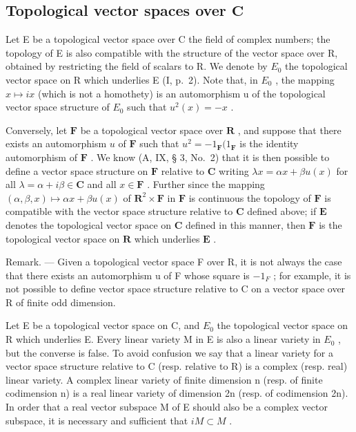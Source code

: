 \subsection{\texorpdfstring{Topological vector spaces over \(\mathbf{C}\)}{Topological vector spaces over the complex field}}

Let E be a topological vector space over C the field of complex numbers; the topology of E is also compatible with the structure of the vector space over R, obtained by restricting the field of scalars to R. We denote by \(E_{0}\) the topological vector space on R which underlies E (I, p.~2). Note that, in \(E_{0}\) , the mapping \(x \mapsto ix\) (which is not a homothety) is an automorphism u of the topological vector space structure of \(E_{0}\) such that \(u^{2}(x) = -x\) .

Conversely, let \(\mathbf{F}\) be a topological vector space over \(\mathbf{R}\) , and suppose that there exists an automorphism \(u\) of \(\mathbf{F}\) such that \(u^2 = -1_{\mathbf{F}}(1_{\mathbf{F}}\) is the identity automorphism of \(\mathbf{F}\) . We know (A, IX, § 3, No.~2) that it is then possible to define a vector space structure on \(\mathbf{F}\) relative to \(\mathbf{C}\) writing \(\lambda x = \alpha x + \beta u(x)\) for all \(\lambda = \alpha + i\beta \in \mathbf{C}\) and all \(x \in \mathbf{F}\) . Further since the mapping \((\alpha, \beta, x) \mapsto \alpha x + \beta u(x)\) of \(\mathbf{R}^2 \times \mathbf{F}\) in \(\mathbf{F}\) is continuous the topology of \(\mathbf{F}\) is compatible with the vector space structure relative to \(\mathbf{C}\) defined above; if \(\mathbf{E}\) denotes the topological vector space on \(\mathbf{C}\) defined in this manner, then \(\mathbf{F}\) is the topological vector space on \(\mathbf{R}\) which underlies \(\mathbf{E}\) .

Remark. --- Given a topological vector space F over R, it is not always the case that there exists an automorphism u of F whose square is \(-1_{F}\) ; for example, it is not possible to define vector space structure relative to C on a vector space over R of finite odd dimension.

Let E be a topological vector space on C, and \(E_{0}\) the topological vector space on R which underlies E. Every linear variety M in E is also a linear variety in \(E_{0}\) , but the converse is false. To avoid confusion we say that a linear variety for a vector space structure relative to C (resp. relative to R) is a complex (resp. real) linear variety. A complex linear variety of finite dimension n (resp. of finite codimension n) is a real linear variety of dimension 2n (resp. of codimension 2n). In order that a real vector subspace M of E should also be a complex vector subspace, it is necessary and sufficient that \(iM \subset M\) .

